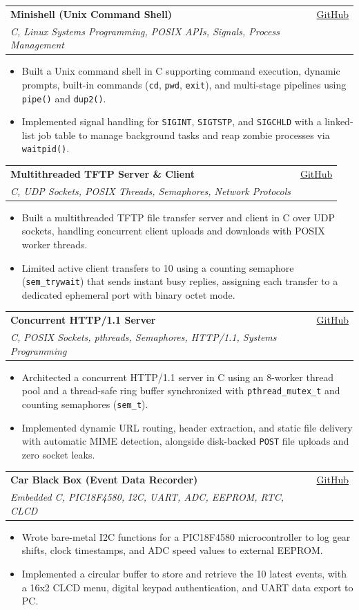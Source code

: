 \documentclass[letterpaper,11pt]{article}
\makeatletter
\newcommand{\resumeItem}[1]{
  \item
    {#1 \vspace{-3pt}}
}
\newcommand{\resumeSubheading}[4]{
  \vspace{-2pt}\item
    \begin{tabular*}{0.97\textwidth}[t]{l@{\extracolsep{\fill}}r}
      \textbf{#1} & #2 \\
      \textit{#3} & {#4} \\
    \end{tabular*}\vspace{-7pt}
}
\newcommand{\resumeItemListStart}{\begin{itemize}[topsep=2pt, itemsep=1pt, parsep=0pt]}
\newcommand{\resumeItemListEnd}{\end{itemize}\vspace{-6pt}}
\makeatother
\begin{document}
    \resumeSubheading
      {Minishell (Unix Command Shell)}{\href{https://github.com/k0-R0/Minishell}{GitHub}}
      {C, Linux Systems Programming, POSIX APIs, Signals, Process Management}{}
      \resumeItemListStart
        \resumeItem{Built a Unix command shell in C supporting command execution, dynamic prompts, built-in commands (\texttt{cd}, \texttt{pwd}, \texttt{exit}), and multi-stage pipelines using \texttt{pipe()} and \texttt{dup2()}.}
        \resumeItem{Implemented signal handling for \texttt{SIGINT}, \texttt{SIGTSTP}, and \texttt{SIGCHLD} with a linked-list job table to manage background tasks and reap zombie processes via \texttt{waitpid()}.}
      \resumeItemListEnd

    \resumeSubheading
      {Multithreaded TFTP Server \& Client}{\href{https://github.com/k0-R0/TFTP}{GitHub}}
      {C, UDP Sockets, POSIX Threads, Semaphores, Network Protocols}{}
      \resumeItemListStart
        \resumeItem{Built a multithreaded TFTP file transfer server and client in C over UDP sockets, handling concurrent client uploads and downloads with POSIX worker threads.}
        \resumeItem{Limited active client transfers to 10 using a counting semaphore (\texttt{sem\_trywait}) that sends instant busy replies, assigning each transfer to a dedicated ephemeral port with binary octet mode.}
      \resumeItemListEnd

    \resumeSubheading
      {Concurrent HTTP/1.1 Server}{\href{https://github.com/k0-R0/HTTP_Server}{GitHub}}
      {C, POSIX Sockets, pthreads, Semaphores, HTTP/1.1, Systems Programming}{}
      \resumeItemListStart
        \resumeItem{Architected a concurrent HTTP/1.1 server in C using an 8-worker thread pool and a thread-safe ring buffer synchronized with \texttt{pthread\_mutex\_t} and counting semaphores (\texttt{sem\_t}).}
        \resumeItem{Implemented dynamic URL routing, header extraction, and static file delivery with automatic MIME detection, alongside disk-backed \texttt{POST} file uploads and zero socket leaks.}
      \resumeItemListEnd

    \resumeSubheading
      {Car Black Box (Event Data Recorder)}{\href{https://github.com/k0-R0/car_blackbox}{GitHub}}
      {Embedded C, PIC18F4580, I2C, UART, ADC, EEPROM, RTC, CLCD}{}
      \resumeItemListStart
        \resumeItem{Wrote bare-metal I2C functions for a PIC18F4580 microcontroller to log gear shifts, clock timestamps, and ADC speed values to external EEPROM.}
        \resumeItem{Implemented a circular buffer to store and retrieve the 10 latest events, with a 16x2 CLCD menu, digital keypad authentication, and UART data export to PC.}
      \resumeItemListEnd
\end{document}
